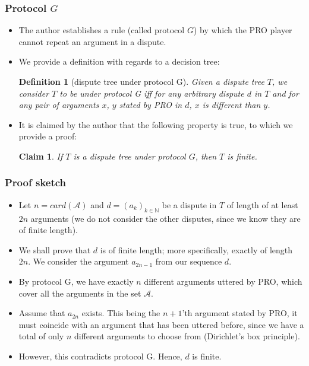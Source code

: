 \documentclass{beamer}
\newtheorem{Def}{Definition}[subsection]
\newtheorem{Claim}{Claim}
\begin{document}
\begin{frame}
	\frametitle{Protocol $G$}
	\begin{itemize}
		\item The author establishes a rule (called protocol $G$) by which the PRO player cannot repeat an argument in a dispute.\pause
		\item We provide a definition with regards to a decision tree:\pause
		\begin{Def}[dispute tree under protocol G]\label{protG}
			Given a dispute tree $T$, we consider $T$ to be under protocol G iff for any arbitrary dispute $d$ in $T$ and for any pair of arguments $x$, $y$ stated by PRO in $d$, $x$ is different than $y$.
		\end{Def}\pause
		\item It is claimed by the author that the following property is true, to which we provide a proof:\pause

		\begin{Claim}
			If $T$ is a dispute tree under protocol $G$, then $T$ is finite.
		\end{Claim}
	\end{itemize}
\end{frame}

\begin{frame}
	\frametitle{Proof sketch}
	\begin{itemize}
		\item Let $n = card(\mathcal{A})$ and $d = (a_{k})_{k \in \mathbb{N}}$ be a dispute in $T$ of length of at least $2n$ arguments (we do not consider the other disputes, since we know they are of finite length).\pause
		\item We shall prove that $d$ is of finite length; more specifically, exactly of length $2n$. We consider the argument $a_{2n - 1}$ from our sequence $d$.\pause
		\item By protocol G, we have exactly $n$ different arguments uttered by PRO, which cover all the arguments in the set $\mathcal{A}$. \pause
		\item Assume that $a_{2n}$ exists. This being the $n+1$'th argument stated by PRO, it must coincide with an argument that has been uttered before, since we have a total of only $n$ different arguments to choose from (Dirichlet's box principle). \pause
		\item However, this contradicts protocol G. Hence, $d$ is finite.
	\end{itemize}
\end{frame}
\end{document}
